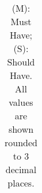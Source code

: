 \documentclass[runningheads]{llncs}
\begin{document}
\begin{table}[H]
{\begin{tabular}{|l|c|r|r|r|r|r|r|r|r|r|}
    \hline
    \end{tabular}
}
\caption*{(M): Must Have; (S): Should Have. All values are shown rounded to 3 decimal places.}
\end{table}
\end{document}

